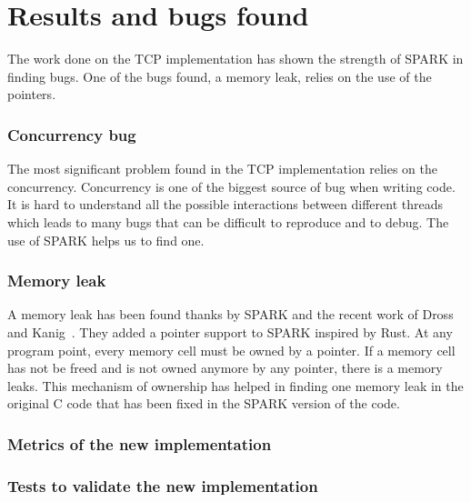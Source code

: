 \documentclass[runningheads]{llncs}
\begin{document}
\section{Results and bugs found}
\label{sec:results}

    The work done on the TCP implementation has shown the strength
    of SPARK in finding bugs. One of the bugs found, a memory leak,
    relies on the use of the pointers.

\subsubsection{Concurrency bug}

    The most significant problem found in the TCP implementation relies on the concurrency.
    Concurrency is one of the biggest source of bug when writing code. It is hard to understand
    all the possible interactions between different threads which leads to many bugs that can be
    difficult to reproduce and to debug. The use of SPARK helps us to find one.


\subsubsection{Memory leak}

    A memory leak has been found thanks by SPARK and the recent work of Dross and Kanig~\cite{dross2020recursive}.
    They added a pointer support to SPARK inspired by Rust. At any program point, every memory cell must be owned by a pointer.
    If a memory cell has not be freed and is not owned anymore by any pointer, there is a memory leaks.
    This mechanism of ownership has helped in finding one memory leak in the original C code that has been fixed in the
    SPARK version of the code.


\subsubsection{Metrics of the new implementation}

\subsubsection{Tests to validate the new implementation}
\end{document}
